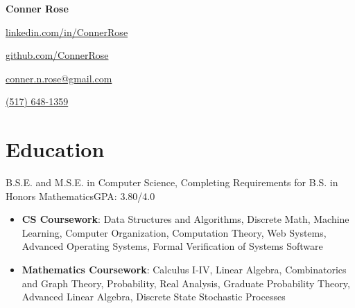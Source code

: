 \documentclass[letterpaper,11pt]{article}
\begin{document}
\begin{center}
  \Huge{\textbf{Conner Rose}} \\
  \begin{itemize*}
    \item[] \href{https://linkedin.com/in/ConnerRose}{linkedin.com/in/ConnerRose}
    \item \href{https://github.com/ConnerRose}{github.com/ConnerRose}
    \item \href{mailto:conner.n.rose@gmail.com}{conner.n.rose@gmail.com}
    \item \href{tel:+15176481359}{(517) 648-1359}
  \end{itemize*}
\end{center}

\section{Education}
{B.S.E. and M.S.E. in Computer Science, Completing Requirements for B.S. in
  Honors Mathematics}{GPA: 3.80/4.0}
\begin{itemize}
  \item \textbf{CS Coursework}: Data Structures and Algorithms, Discrete Math,
        Machine Learning, Computer Organization, Computation Theory,
        Web Systems, Advanced Operating Systems, Formal Verification of Systems
        Software
  \item \textbf{Mathematics Coursework}: Calculus I-IV, Linear Algebra,
        Combinatorics and Graph Theory, Probability, Real Analysis, Graduate
        Probability Theory, Advanced Linear Algebra, Discrete State Stochastic
        Processes
\end{itemize}
\end{document}
